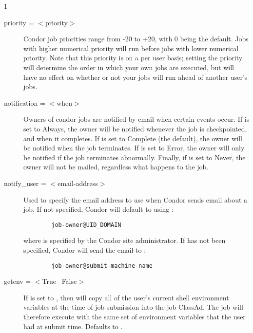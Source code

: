 \begin{ManPage}{\label{man-condor-submit}}{1}
\begin{description}

\item[priority = $<$priority$>$] Condor job priorities range from -20 to
+20, with 0 being the default. Jobs with higher numerical priority will
run before jobs with lower numerical priority. Note that this priority
is on a per user basis; setting the priority will determine the order in
which your own jobs are executed, but will have no effect on whether or
not your jobs will run ahead of another user's jobs. 


\item[notification = $<$when$>$] Owners of condor jobs are notified by
email when certain events occur. If  is set to
\mbox{Always}, the owner will be notified whenever the job is
checkpointed, and when it completes. If  is set to
\mbox{Complete} (the default), the owner will be notified when the
job terminates. If  is set to \mbox{Error}, the owner will
only be notified if the job terminates abnormally. Finally, if
 is set to \mbox{Never}, the owner will not be mailed,
regardless what happens to the job. 


\item[notify\_user = $<$email-address$>$] Used to specify the email
address to use when Condor sends email about a job.  If not specified,
Condor will default to using :
\begin{verbatim}
        job-owner@UID_DOMAIN
\end{verbatim}
where  is specified by the Condor site administrator.  If 
 has not been specified, Condor will send the email
to :
\begin{verbatim}
        job-owner@submit-machine-name
\end{verbatim}


\item[getenv = $<$True \Bar\ False$>$] If  is set to
, then  will copy all of the user's current
shell environment variables at the time of job submission into the job
ClassAd. The job will therefore execute with the same set of environment
variables that the user had at submit time. Defaults to .


\end{description}
\end{ManPage}
